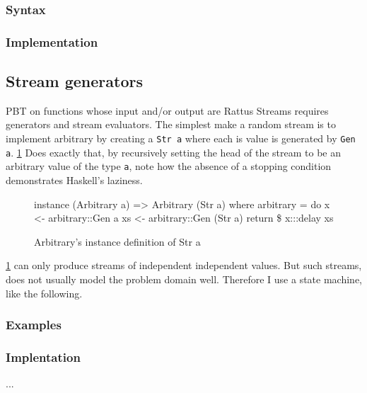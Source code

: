 

        
\subsubsection{Syntax}
\subsubsection{Implementation}


\subsection{Stream generators}
PBT on functions whose input and/or output are Rattus Streams requires generators and stream evaluators. The simplest make a random stream is to implement arbitrary  by creating a \verb|Str a| where each is value is generated by \verb|Gen a|.
\ref{lst:ArbStr} Does exactly that, by recursively setting the head of the stream to be an arbitrary value of the type \verb|a|, note how the absence of a stopping condition demonstrates Haskell's laziness. 
\begin{figure}
    \begin{hscode}
        instance (Arbitrary a) => Arbitrary (Str a) where
        arbitrary = do
            x <- arbitrary::Gen a
            xs <- arbitrary::Gen (Str a)
            return \$ x:::delay xs
    \end{hscode}
    \caption{Arbitrary's instance definition of Str a}
    \label{lst:ArbStr}
\end{figure}
\ref{lst:ArbStr} can only produce streams of independent independent values. But such streams, does not usually model the problem domain well. Therefore I use a state machine, like the following.
\subsubsection{Examples}
\subsubsection{Implentation}
...